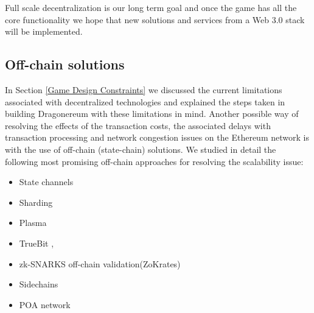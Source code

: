 \documentclass[12pt]{article}
\begin{document}
Full scale decentralization is our long term goal and once the game has all the core functionality we hope that new solutions and services from a Web 3.0 stack will be implemented.



\vspace{\baselineskip}\subsection{Off-chain solutions}
 \label{Off-chain solutions} \par

In Section \ref{Game Design Constraints} we discussed the current limitations associated with decentralized technologies and explained the steps taken in building Dragonereum with these limitations in mind. Another possible way of resolving the effects of the transaction costs, the associated delays with transaction processing and network congestion issues on the Ethereum network is with the use of off-chain (state-chain) solutions. We studied in detail the following most promising off-chain approaches for resolving the scalability issue:\par

\begin{itemize}
	\item State channels \cite{Joseph_Poon_et_al_2016}\par

	\item Sharding \cite{Vitalik_Buterin_2016}\par

	\item Plasma \cite{Josh_Stark__2018_February_12}\par

	\item TrueBit \cite{Jason_Teutsch_et_al_2017}, \cite{Julia_Koch_et_al_2018}\par

	\item zk-SNARKS off-chain validation(ZoKrates) \cite{Jacob_Eberhardt_2018}\par

	\item Sidechains \cite{Adam_Back_et_al_2014}\par
	
	\item POA network \cite{Stephen_Arsenault_2018}
\end{itemize}\par
\end{document}
